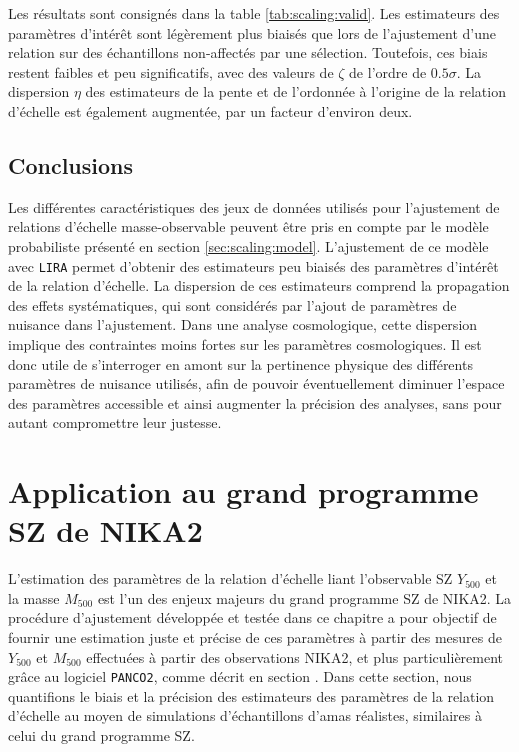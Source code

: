 Les résultats sont consignés dans la table \ref{tab:scaling:valid}.
Les estimateurs des paramètres d'intérêt sont légèrement plus biaisés que lors de l'ajustement d'une relation sur des échantillons non-affectés par une sélection.
Toutefois, ces biais restent faibles et peu significatifs, avec des valeurs de $\zeta$ de l'ordre de $0.5\sigma$.
La dispersion $\eta$ des estimateurs de la pente et de l'ordonnée à l'origine de la relation d'échelle est également augmentée, par un facteur d'environ deux.

\subsection*{Conclusions}

Les différentes caractéristiques des jeux de données utilisés pour l'ajustement de relations d'échelle masse-observable peuvent être pris en compte par le modèle probabiliste présenté en section \ref{sec:scaling:model}.
L'ajustement de ce modèle avec \texttt{LIRA} permet d'obtenir des estimateurs peu biaisés des paramètres d'intérêt de la relation d'échelle.
La dispersion de ces estimateurs comprend la propagation des effets systématiques, qui sont considérés par l'ajout de paramètres de nuisance dans l'ajustement.
Dans une analyse cosmologique, cette dispersion implique des contraintes moins fortes sur les paramètres cosmologiques.
Il est donc utile de s'interroger en amont sur la pertinence physique des différents paramètres de nuisance utilisés, afin de pouvoir éventuellement diminuer l'espace des paramètres accessible et ainsi augmenter la précision des analyses, sans pour autant compromettre leur justesse.

\section{Application au grand programme SZ de NIKA2}
\label{sec:scaling:lpsz}

L'estimation des paramètres de la relation d'échelle liant l'observable SZ $Y_{500}$ et la masse $M_{500}$ est l'un des enjeux majeurs du grand programme SZ de NIKA2.
La procédure d'ajustement développée et testée dans ce chapitre a pour objectif de fournir une estimation juste et précise de ces paramètres à partir des mesures de $Y_{500}$ et $M_{500}$ effectuées à partir des observations NIKA2, et plus particulièrement grâce au logiciel \texttt{PANCO2}, comme décrit en section .
Dans cette section, nous quantifions le biais et la précision des estimateurs des paramètres de la relation d'échelle au moyen de simulations d'échantillons d'amas réalistes, similaires à celui du grand programme SZ.

